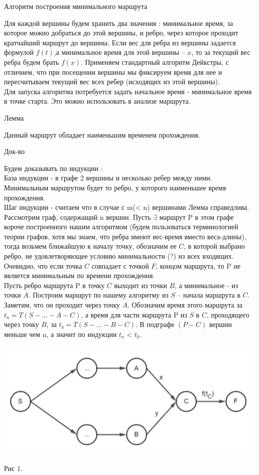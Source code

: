 \documentclass[12pt, a4paper]{article}
\begin{document}
$\textbf{Алгоритм построения минимального маршрута}$

Для каждой вершины будем хранить два значения : минимальное время, за которое можно добраться до этой вершины, и ребро, через которое проходит кратчайший маршрут до вершины.
Если вес для ребра из вершины задается формулой $f(t)$,а минимальное время для этой вершины -- $x$, то за текущий вес ребра будем брать $f(x)$.
Применяем стандартный алгоритм Дейкстры, с отличием, что при посещении вершины мы фиксируем время для нее и пересчитываем текущий вес всех ребер (исходящих из этой вершины).\\
Для запуска алгоритма потребуется задать начальное время - минимальное время в точке старта. Это можно использовать в анализе маршрута.

$\textbf{Лемма}$

Данный маршрут обладает наименьшим временем прохождения.

$\textit{Док-во}$

Будем доказывать по индукции :\\
База индукции - в графе 2 вершины и несколько ребер между ними. Минимальным маршрутом будет то ребро, у которого наименьшее время прохождения.\\
Шаг индукции - считаем что в случае с m(< n) вершинами Лемма справедлива. Рассмотрим граф, содержащий n вершин. Пусть $\exists$ маршрут P в этом графе короче построенного нашим алгоритмом (будем пользоваться терминологией теории графов, хотя мы знаем, что ребра имеют вес-время вместо веса-длины), тогда возьмем ближайшую к началу точку, обозначим ее $C$, в которой выбрано ребро, не удовлетворяющее условию минимальности (?) из всех входящих. Очевидно, что если точка $C$ совпадает с точкой $F$, концом маршрута, то P не является минимальным по времени прохождения. \\
 Пусть ребро маршрута P в точку $C$ выходит из точки $B$, а минимальное - из точки $A$. Построим маршрут по нашему алгоритму из $S$ -- начала маршрута в $C$. Заметим, что он проходит через точку $A$. Обозначим время этого маршрута за $t_a = T(S-...-A-C)$, а время для части маршрута P из $S$ в $C$, проходящего через точку $B$, за $t_b = T(S-...-B-C)$. В подграфе $(P-C)$ вершин меньше чем n, а значит по индукции $t_a$ < $t_b$. 
\begin{center}
\includegraphics[scale=0.3]{graph_1.jpg}
\end{center}
\begin{center}
Рис 1.
\end{center}
\end{document}
